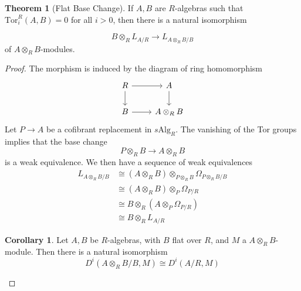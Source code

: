 \documentclass{article}
\theoremstyle{definition}
\newtheorem{theorem}{Theorem}[section]
\theoremstyle{definition}
\theoremstyle{definition}
\theoremstyle{definition}
\theoremstyle{definition}
\theoremstyle{definition}
\newtheorem{corollary}{Corollary}[theorem]
\theoremstyle{definition}
\begin{document}
\begin{theorem}[Flat Base Change]
	If $A,B$ are $R$-algebras such that $\mathrm{Tor}^R_i(A,B)=0$ for all $i>0$, then there is a natural isomorphism


	\[ B\otimes_R L_{A/R}\to L_{A\otimes_RB/B}\]
	of $A\otimes_R B$-modules.
\end{theorem}
\begin{proof}
	The morphism is induced by the diagram of ring homomorphism 
	\[\begin{tikzcd}
	R & A \\
	B & {A\otimes_R B}
	\arrow[from=1-1, to=1-2]
	\arrow[from=1-1, to=2-1]
	\arrow[from=1-2, to=2-2]
	\arrow[from=2-1, to=2-2]
\end{tikzcd}\]
Let $P\to A$ be a cofibrant replacement in $s \textrm{Alg}_R$. The vanishing of the Tor groups implies that the base change
\[P\otimes_{R}B\to A\otimes_R B\]
is a weak equivalence. We then have a sequence of weak equivalences 
\begin{align*}
L_{A\otimes_R B/B}&\cong (A\otimes_R B)\otimes_{P\otimes_R B}\Omega_{P\otimes_R B/B}\\
&\cong (A\otimes_R B)\otimes_{P}\Omega_{P/R}\\
&\cong B\otimes_R (A\otimes_P \Omega_{P/R})\\
&\cong B\otimes_R L_{A/R}
\end{align*}

\begin{corollary}
	Let $A,B$ be $R$-algebras, with $B$ flat over $R$, and $M$ a $A\otimes_R B$-module. Then there is a natural isomorphism
	\[D^i(A\otimes_R B/B, M)\cong D^i(A/R,M)\]
\end{corollary}






\end{proof}
\end{document}
